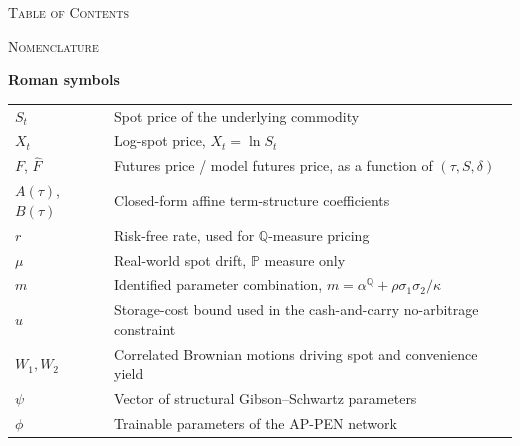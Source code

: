\documentclass[11pt, a4paper]{article}
\begin{document}


\thispagestyle{empty}
\begin{center}
{\Large\scshape Table of Contents}
\end{center}
\vspace{0.4cm}
\makeatletter
{}
\makeatother
\clearpage

\thispagestyle{empty}
\begin{center}
{\Large\scshape Nomenclature}
\end{center}
\vspace{0.4cm}

\noindent\textbf{Roman symbols}
\begin{tabular}{@{}p{2.2cm}p{13.5cm}@{}}
$S_t$ & Spot price of the underlying commodity \\
$X_t$ & Log-spot price, $X_t = \ln S_t$ \\
$F$, $\hat F$ & Futures price / model futures price, as a function of $(\tau, S, \delta)$ \\
$A(\tau)$, $B(\tau)$ & Closed-form affine term-structure coefficients \\
$r$ & Risk-free rate, used for $\mathbb{Q}$-measure pricing \\
$\mu$ & Real-world spot drift, $\mathbb{P}$ measure only \\
$m$ & Identified parameter combination, $m = \alpha^{\mathbb{Q}} + \rho\sigma_1\sigma_2/\kappa$ \\
$u$ & Storage-cost bound used in the cash-and-carry no-arbitrage constraint \\
$W_1, W_2$ & Correlated Brownian motions driving spot and convenience yield \\
$\psi$ & Vector of structural Gibson--Schwartz parameters \\
$\phi$ & Trainable parameters of the AP-PEN network \\
\end{tabular}
\end{document}

